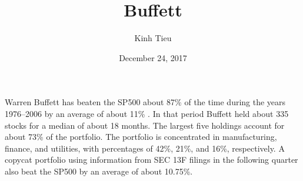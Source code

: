 \documentclass{article}
\begin{document}
\title{Buffett}
\author{Kinh Tieu}
\date{December 24, 2017}
\maketitle

Warren Buffett has beaten the SP500 about 87\% of the time during the years 1976--2006 by an average of about 11\% \cite{martin2008imitation}.  In that period Buffett held about 335 stocks for a median of about 18 months.  The largest five holdings account for about 73\% of the portfolio.  The portfolio is concentrated in manufacturing, finance, and utilities, with percentages of 42\%, 21\%, and 16\%, respectively.  A copycat portfolio using information from SEC 13F filings in the following quarter also beat the SP500 by an average of about 10.75\%.



\end{document}
